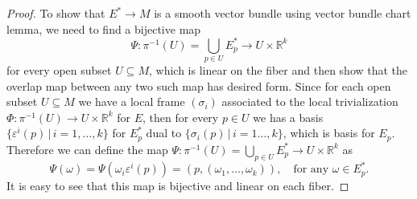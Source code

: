 \documentclass[a4paper]{article}
\theoremstyle{remark}
\newcommand{\rk}{\mathbb{R}^k} %
\newcommand{\subhim}{\subseteq} %
\begin{document}
\begin{proof}
To show that $E^* \to M$ is a smooth vector bundle using vector bundle chart lemma, we need to find a bijective map
$$
\Psi : \pi^{-1}(U) = \bigcup_{p \in U} E^*_p \to U \times \rk
$$
for every open subset $U \subhim M$, which is linear on the fiber and then show that the overlap map between any two such map has desired form. Since for each open subset $U \subhim M$ we have a local frame $(\sigma_i)$ associated to the local trivialization $\Phi : \pi^{-1}(U) \to U \times \rk$ for $E$, then for every $p \in U$ we has a basis $\{\varepsilon^i(p) \, | \, i =1,\dots,k\}$ for $E^*_p$ dual to $\{\sigma_i(p) \,| \, i=1\dots,k\}$, which is basis for $E_p$. Therefore we can define the map $\Psi : \pi^{-1}(U) = \bigcup_{p \in U} E^*_p \to U \times \rk$ as
$$
\Psi (\omega) = \Psi (\omega_i \varepsilon^i(p)) = (p , (\omega_1,\dots,\omega_k)), \quad \text{for any } \omega \in E^*_p.
$$
It is easy to see that this map is bijective and linear on each fiber.


\end{proof}
\end{document}
